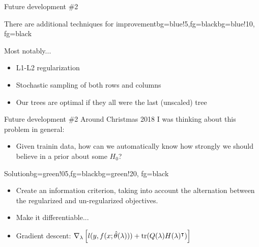 \begin{frame}{Future development \#2}
	
	\begin{myblock}{There are additional techniques for improvement}{bg=blue!5,fg=black}{bg=blue!10, fg=black}
	
		Most notably...
		\begin{itemize}
			\item<1-> \colorbox{red!20}{L1-L2 regularization}
			\item<1-> Stochastic sampling of both rows and columns
			\item<1-> Our trees are optimal if they all were the last (unscaled) tree
		\end{itemize}
	\end{myblock}
\end{frame}

\begin{frame}{Future development \#2}
		Around Christmas 2018 I was thinking about this problem in general: %
		\begin{itemize}
			\item Given trainin data, how can we automatically know how strongly we should believe in a prior about some $H_0$?
		\end{itemize}
		\begin{myblock}{Solution}{bg=green!05,fg=black}{bg=green!20, fg=black}
		\begin{itemize}
			\item Create an information criterion, taking into account the alternation between the regularized and un-regularized objectives.
			\item Make it differentiable...
			\item Gradient descent: $\nabla_\lambda \left[ l(y,f(x;\hat{\theta}(\lambda))) + \mathrm{tr}(Q(\lambda)H(\lambda)^\intercal) \right]$
		\end{itemize}
		\end{myblock}
	
		
		
%		
	
\end{frame}

